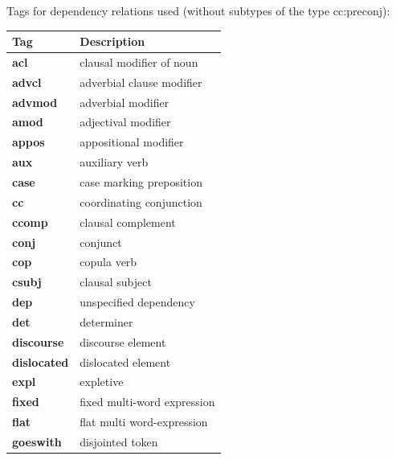 \documentclass[a4paper,oneside,12pt]{article}
\begin{document}
\begin{samepage}
  Tags for dependency relations used (without subtypes of the type cc:preconj):


  \begin{longtable}{|l|l|}
    \hline
    \textbf{Tag}        & \textbf{Description}               \\ \hline
    \endhead
    \textbf{acl}        & clausal modifier of noun           \\ \hline
    \textbf{advcl}      & adverbial clause modifier          \\ \hline
    \textbf{advmod}     & adverbial modifier                 \\ \hline
    \textbf{amod}       & adjectival modifier                \\ \hline
    \textbf{appos}      & appositional modifier              \\ \hline
    \textbf{aux}        & auxiliary verb                     \\ \hline
    \textbf{case}       & case marking preposition           \\ \hline
    \textbf{cc}         & coordinating conjunction           \\ \hline
    \textbf{ccomp}      & clausal complement                 \\ \hline
    \textbf{conj}       & conjunct                           \\ \hline
    \textbf{cop}        & copula verb                        \\ \hline
    \textbf{csubj}      & clausal subject                    \\ \hline
    \textbf{dep}        & unspecified dependency             \\ \hline
    \textbf{det}        & determiner                         \\ \hline
    \textbf{discourse}  & discourse element                  \\ \hline
    \textbf{dislocated} & dislocated element                 \\ \hline
    \textbf{expl}       & expletive                          \\ \hline
    \textbf{fixed}      & fixed multi-word expression        \\ \hline
    \textbf{flat}       & flat multi word-expression         \\ \hline
    \textbf{goeswith}   & disjointed token                   \\ \hline

\end{longtable}
\end{samepage}
\end{document}
